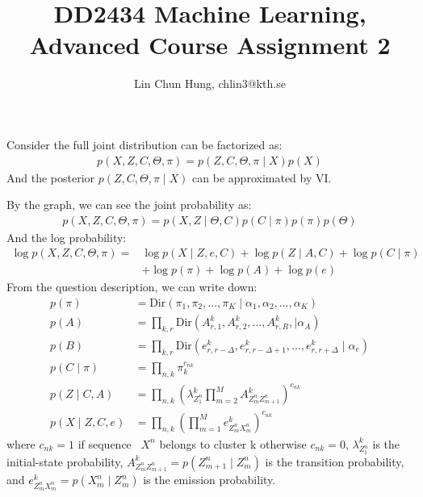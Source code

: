 \documentclass[12pt]{article}
\newenvironment{problem}[2][Problem]{\begin{trivlist}
\item[\hskip \labelsep {\bfseries #1}\hskip \labelsep {\bfseries #2.}]}{\end{trivlist}}
\begin{document}
 
 
\title{DD2434 Machine Learning, Advanced Course Assignment 2}
\author{Lin Chun Hung, chlin3@kth.se}
\maketitle

\begin{problem}{2.8.24}
Consider the full joint distribution can be factorized as:
\begin{align*}
    p(X, Z, C, \Theta, \pi) = p(Z, C, \Theta, \pi \mid X)p(X)
\end{align*}
And the posterior $p(Z, C, \Theta, \pi \mid X)$ can be approximated by VI.

\medskip
By the graph, we can see the joint probability as:
\begin{align*}
    p(X, Z, C, \Theta, \pi) = p(X, Z \mid \Theta, C) p(C\mid \pi) p(\pi) p(\Theta)
\end{align*}
And the log probability:
\begin{align*}
    \log p(X, Z, C, \Theta, \pi) = 
    &\log p(X \mid Z, e, C) + \log p(Z \mid A, C) + \log p(C\mid \pi)  \\
    & + \log p(\pi) + \log p(A)  + \log p(e)
\end{align*}
From the question description, we can write down:
\begin{align*}
    p(\pi) &= \mathrm{Dir}(\pi_1, \pi_2, ..., \pi_K \mid \alpha_1, \alpha_2, ..., \alpha_K) \\
    p(A) &= \prod_{k,r} \mathrm{Dir}(A^k_{r,1}, A^k_{r,2}, ..., A^k_{r,R},\mid \alpha_A) \\
    p(B) &= \prod_{k,r} \mathrm{Dir}(e^k_{r,r-\Delta}, e^k_{r,r-\Delta +1}, ..., e^k_{r,r+\Delta}\mid \alpha_e) \\
    p(C\mid \pi) &= \prod_{n,k} \pi_k^{c_{nk}} \\
    p(Z\mid C, A) &= \prod_{n,k}(\lambda^k_{Z^n_{1}}
        \prod_{m=2}^{M} A^k_{Z^n_{m}Z^n_{m+1}})^{c_{nk}} \\
    p(X\mid Z, C, e) &= \prod_{n,k} (\prod_{m=1}^{M} e^k_{Z^n_{m}X^n_{m}})^{c_{nk}}
\end{align*}
where $c_{nk}=1$ if sequence ~$X^n$ belongs to cluster k otherwise $c_{nk}=0$,
      $\lambda^k_{Z^n_{1}}$ is the initial-state probability,
      $A^k_{Z^n_{m}Z^n_{m+1}} = p(Z^n_{m+1}\mid Z^n_{m})$ is the transition probability,
  and $e^k_{Z^n_{m}X^n_{m}} = p(X^n_{m}\mid Z^n_{m})$ is the emission probability.


\end{problem}
\end{document}
